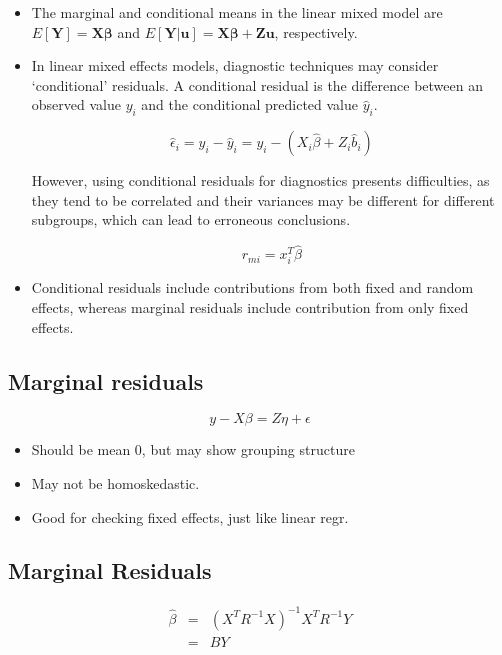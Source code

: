 \documentclass[Main.tex]{subfiles}
\begin{document}
\begin{itemize}
		
\item The marginal and conditional means in the linear mixed model are
	$E[\boldsymbol{Y}] = \boldsymbol{X}\boldsymbol{\beta}$ and
	$E[\boldsymbol{Y|\boldsymbol{u}}] = \boldsymbol{X}\boldsymbol{\beta} + \boldsymbol{Z}\boldsymbol{u}$, respectively.

\item In linear mixed effects models, diagnostic techniques may consider `conditional' residuals. A conditional residual is the difference between an observed value $y_{i}$ and the conditional predicted value $\hat{y}_{i} $.

\[ \hat{\epsilon}_{i} = y_{i} - \hat{y}_{i} = y_{i} - ( X_{i}\hat{\beta} + Z_{i}\hat{b}_{i}) \]

However, using conditional residuals for diagnostics presents difficulties, as they tend to be correlated and their variances may be different for different subgroups, which can lead to erroneous conclusions.



\begin{equation}
r_{mi}=x^{T}_{i}\hat{\beta}
\end{equation}


\item Conditional residuals include contributions from both fixed and random effects, whereas marginal residuals include contribution from only fixed effects.
\end{itemize} 
	




\subsection*{Marginal residuals}

\[y - X\beta = Z \eta +\epsilon \]
\begin{itemize}
	\item
	Should be mean 0, but may show grouping structure
	\item
	May not be homoskedastic.
	\item
	Good for checking fixed effects, just like linear regr.
\end{itemize}
\subsection{Marginal Residuals}
\begin{eqnarray}
\hat{\beta} &=& (X^{T}R^{-1}X)^{-1}X^{T}R^{-1}Y \nonumber \\
&=& BY \nonumber
\end{eqnarray}
\end{document}
